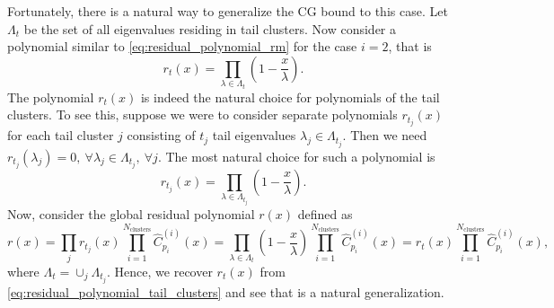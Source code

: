 Fortunately, there is a natural way to generalize the CG bound to this case. Let $\Lambda_{t}$ be the set of all eigenvalues residing in tail clusters. Now consider a polynomial similar to \cref{eq:residual_polynomial_rm} for the case $i=2$, that is
\begin{equation}
    r_{t}(x) = \prod_{\lambda\in\Lambda_{t}} \left(1 - \frac{x}{\lambda}\right).
    \label{eq:residual_polynomial_tail_clusters}
\end{equation}
The polynomial $r_t(x)$ is indeed the natural choice for polynomials of the tail clusters. To see this, suppose we were to consider separate polynomials $r_{t_j}(x)$ for each tail cluster $j$ consisting of $t_j$ tail eigenvalues $\lambda_j\in\Lambda_{t_j}$. Then we need $r_{t_j}(\lambda_j) = 0, \ \forall \lambda_j \in \Lambda_{t_j}, \ \forall j$. The most natural choice for such a polynomial is
\begin{equation}
    r_{t_j}(x) = \prod_{\lambda\in\Lambda_{t_j}} \left(1 - \frac{x}{\lambda}\right).
\end{equation}
Now, consider the global residual polynomial $r(x)$ defined as
\begin{equation}
    r(x) = \prod_{j} r_{t_j}(x) \prod_{i=1}^{N_{\text{clusters}}} \hat{C}^{(i)}_{p_i}(x)= \prod_{\lambda\in\Lambda_{t}} \left(1 - \frac{x}{\lambda}\right)\prod_{i=1}^{N_{\text{clusters}}} \hat{C}^{(i)}_{p_i}(x) = r_t(x)\prod_{i=1}^{N_{\text{clusters}}} \hat{C}^{(i)}_{p_i}(x),
    \label{eq:residual_polynomial_tail_clusters_global}
\end{equation}
where $\Lambda_{t} = \cup_{j} \Lambda_{t_j}$. Hence, we recover $r_t(x)$ from \cref{eq:residual_polynomial_tail_clusters} and see that is a natural generalization.

